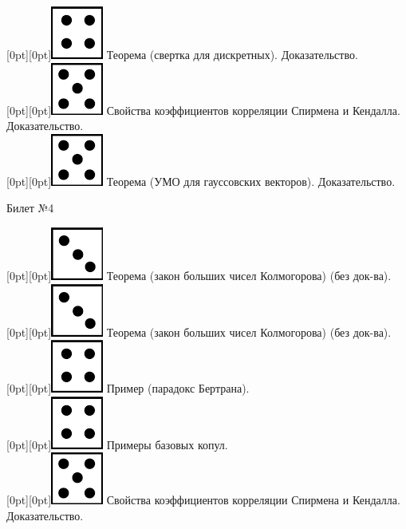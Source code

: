 \documentclass[10pt]{article}
\begin{document}
\raisebox{-1pt}[0pt][0pt]{\includegraphics[width=0.02\linewidth]{4.png}} Теорема (свертка для дискретных).  Доказательство. \\

\raisebox{-1pt}[0pt][0pt]{\includegraphics[width=0.02\linewidth]{5.png}} Свойства коэффициентов корреляции Спирмена и Кендалла. Доказательство. \\ 

\raisebox{-1pt}[0pt][0pt]{\includegraphics[width=0.02\linewidth]{5.png}} Теорема (УМО для гауссовских векторов). Доказательство. \\

\begin{center} {\Large Билет №4} \end{center} 

\raisebox{-1pt}[0pt][0pt]{\includegraphics[width=0.02\linewidth]{3.png}} Теорема (закон больших чисел Колмогорова) (без док-ва). \\

\raisebox{-1pt}[0pt][0pt]{\includegraphics[width=0.02\linewidth]{3.png}} Теорема (закон больших чисел Колмогорова) (без док-ва). \\

\raisebox{-1pt}[0pt][0pt]{\includegraphics[width=0.02\linewidth]{4.png}} Пример (парадокс Бертрана). \\ 

\raisebox{-1pt}[0pt][0pt]{\includegraphics[width=0.02\linewidth]{4.png}} Примеры базовых копул. \\

\raisebox{-1pt}[0pt][0pt]{\includegraphics[width=0.02\linewidth]{5.png}} Свойства коэффициентов корреляции Спирмена и Кендалла. Доказательство. \\ 
\end{document}
